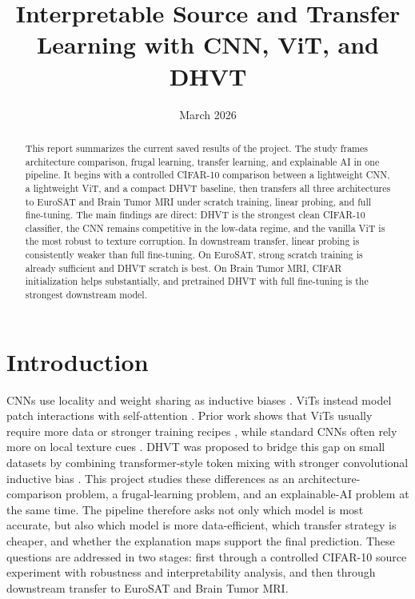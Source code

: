 \documentclass[11pt]{article}
\title{Interpretable Source and Transfer Learning with CNN, ViT, and DHVT}
\author{}
\date{March 2026}
\begin{document}
\maketitle

\begin{abstract}
This report summarizes the current saved results of the project. The study frames architecture comparison, frugal learning, transfer learning, and explainable AI in one pipeline. It begins with a controlled CIFAR-10 comparison between a lightweight CNN, a lightweight ViT, and a compact DHVT baseline, then transfers all three architectures to EuroSAT and Brain Tumor MRI under scratch training, linear probing, and full fine-tuning. The main findings are direct: DHVT is the strongest clean CIFAR-10 classifier, the CNN remains competitive in the low-data regime, and the vanilla ViT is the most robust to texture corruption. In downstream transfer, linear probing is consistently weaker than full fine-tuning. On EuroSAT, strong scratch training is already sufficient and DHVT scratch is best. On Brain Tumor MRI, CIFAR initialization helps substantially, and pretrained DHVT with full fine-tuning is the strongest downstream model.
\end{abstract}

\section{Introduction}
CNNs use locality and weight sharing as inductive biases \cite{lecun1998gradient}. ViTs instead model patch interactions with self-attention \cite{dosovitskiy2021image}. Prior work shows that ViTs usually require more data or stronger training recipes \cite{dosovitskiy2021image,touvron2021training}, while standard CNNs often rely more on local texture cues \cite{geirhos2019imagenet}. DHVT was proposed to bridge this gap on small datasets by combining transformer-style token mixing with stronger convolutional inductive bias \cite{lu2022bridging}. This project studies these differences as an architecture-comparison problem, a frugal-learning problem, and an explainable-AI problem at the same time. The pipeline therefore asks not only which model is most accurate, but also which model is more data-efficient, which transfer strategy is cheaper, and whether the explanation maps support the final prediction. These questions are addressed in two stages: first through a controlled CIFAR-10 source experiment with robustness and interpretability analysis, and then through downstream transfer to EuroSAT and Brain Tumor MRI.
\end{document}
